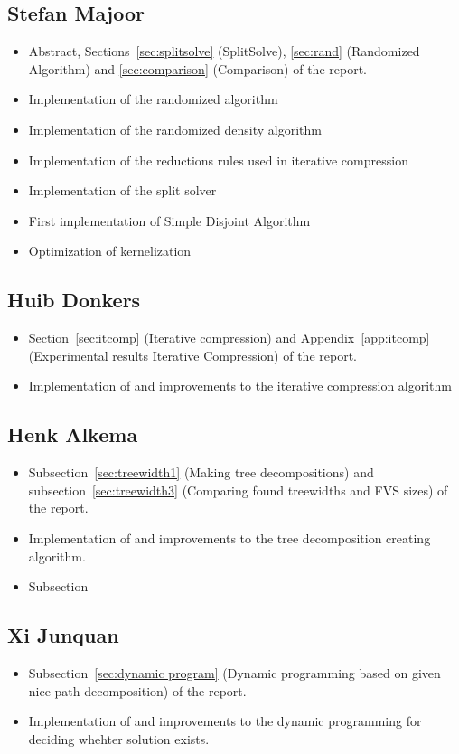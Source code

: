 \subsection{Stefan Majoor}
\begin{itemize}
 \item Abstract, Sections~\ref{sec:splitsolve} (SplitSolve), \ref{sec:rand} (Randomized Algorithm) and \ref{sec:comparison} (Comparison) of the report.
 \item Implementation of the randomized algorithm
 \item Implementation of the randomized density algorithm
 \item Implementation of the reductions rules used in iterative compression
 \item Implementation of the split solver
 \item First implementation of Simple Disjoint Algorithm
 \item Optimization of kernelization
\end{itemize}

\subsection{Huib Donkers}
\begin{itemize}
 \item Section~\ref{sec:itcomp} (Iterative compression) and Appendix~\ref{app:itcomp} (Experimental results Iterative Compression) of the report.
 \item Implementation of and improvements to the iterative compression algorithm
\end{itemize}

\subsection{Henk Alkema}
\begin{itemize}
 \item Subsection~\ref{sec:treewidth1} (Making tree decompositions) and subsection~\ref{sec:treewidth3} (Comparing found treewidths and FVS sizes) of the report.
 \item Implementation of and improvements to the tree decomposition creating algorithm.
 \item Subsection
\end{itemize}

\subsection{Xi Junquan}
\begin{itemize}
 \item Subsection~\ref{sec:dynamic program} (Dynamic programming based on given nice path decomposition) of the report.
 \item Implementation of and improvements to the dynamic programming for deciding whehter solution exists.
\end{itemize}

